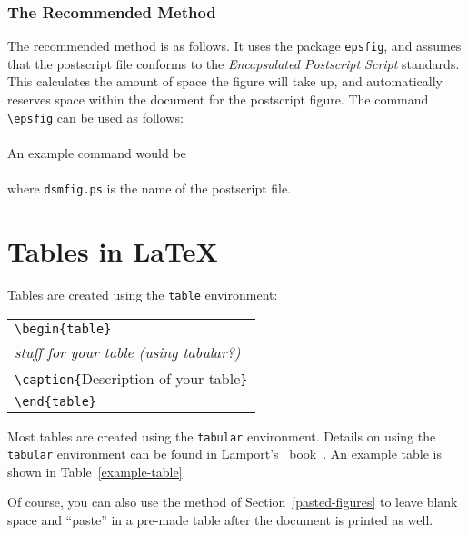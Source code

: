 \subsubsection{The Recommended Method}
\label{epsf-method}

The recommended method is as follows. It uses the package
{\tt epsfig}, and assumes that the postscript file conforms to the
{\em Encapsulated Postscript Script} standards. This calculates the
amount of space the figure will take up, and automatically reserves
space within the document for the postscript figure.  The command
{\tt \verb+\+epsfig} can be used as follows:\\
\\
An example command would be\\
\\
where {\tt dsmfig.ps} is the name of the postscript file.


\newpage
\section[Tables in \LaTeX]{Tables in \LaTeX}
\label{latex-tables}

Tables are created using the {\tt table} environment:
%
\begin{center}
\begin{tabular}{l}
\verb#\begin{table}#\\
{\em stuff for your table (using tabular?)}\\
\verb#\caption{#Description of your table\verb#}#\\
\verb#\end{table}#
\end{tabular}
\end{center}
%
Most tables are created using the {\tt tabular} environment. Details
on using the {\tt tabular} environment can be found in Lamport's
\LaTeXe\ book~\cite{lamport:latex}.  An example table is shown in
Table~\ref{example-table}.

Of course, you can also use the method of Section~\ref{pasted-figures}
to leave blank space and ``paste'' in a pre-made table after the
document is printed as well.

